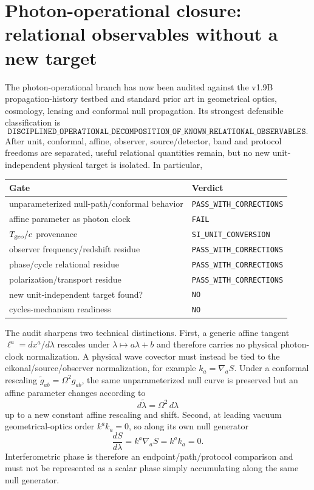 \documentclass[11pt,a4paper]{article}
\begin{document}
\section{Photon-operational closure: relational observables without a new target}
\label{sec:photon-op}
The photon-operational branch has now been audited against the v1.9B propagation-history testbed and standard prior art in geometrical optics, cosmology, lensing and conformal null propagation.  Its strongest defensible classification is
\begin{equation}
\boxed{\texttt{DISCIPLINED\_OPERATIONAL\_DECOMPOSITION\_OF\_KNOWN\_RELATIONAL\_OBSERVABLES}}.
\end{equation}
After unit, conformal, affine, observer, source/detector, band and protocol freedoms are separated, useful relational quantities remain, but no new unit-independent physical target is isolated.  In particular,
\begin{center}
\begin{tabular}{ll}
\toprule
Gate & Verdict\\
\midrule
unparameterized null-path/conformal behavior & \texttt{PASS\_WITH\_CORRECTIONS}\\
affine parameter as photon clock & \texttt{FAIL}\\
$T_{\rm geo}/c$ provenance & \texttt{SI\_UNIT\_CONVERSION}\\
observer frequency/redshift residue & \texttt{PASS\_WITH\_CORRECTIONS}\\
phase/cycle relational residue & \texttt{PASS\_WITH\_CORRECTIONS}\\
polarization/transport residue & \texttt{PASS\_WITH\_CORRECTIONS}\\
new unit-independent target found? & \texttt{NO}\\
cycles-mechanism readiness & \texttt{NO}\\
\bottomrule
\end{tabular}
\end{center}
The audit sharpens two technical distinctions.  First, a generic affine tangent $\ell^a=dx^a/d\lambda$ rescales under $\lambda\mapsto a\lambda+b$ and therefore carries no physical photon-clock normalization.  A physical wave covector must instead be tied to the eikonal/source/observer normalization, for example $k_a=\nabla_aS$.  Under a conformal rescaling $\widetilde g_{ab}=\Omega^2g_{ab}$, the same unparameterized null curve is preserved but an affine parameter changes according to
\begin{equation}
 d\widetilde\lambda=\Omega^2\,d\lambda
\end{equation}
up to a new constant affine rescaling and shift.  Second, at leading vacuum geometrical-optics order $k^ak_a=0$, so along its own null generator
\begin{equation}
 \frac{dS}{d\lambda}=k^a\nabla_aS=k^ak_a=0.
\end{equation}
Interferometric phase is therefore an endpoint/path/protocol comparison and must not be represented as a scalar phase simply accumulating along the same null generator.
\end{document}
